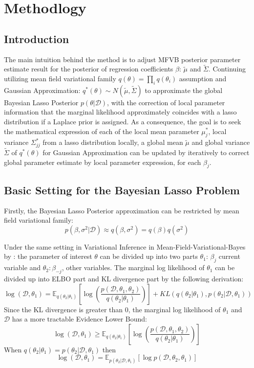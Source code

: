 \chapter{Methodlogy}
\label{Chapter3}
\section{Introduction}
The main intuition behind the method is to adjust MFVB posterior parameter estimate result for the posterior of regression coefficients $\beta$: $\tilde{\mu}$ and $\tilde{\Sigma}$. Continuing utilizing mean field variational family $q(\theta) = \prod_i q(\theta_i)$ assumption and Gaussian Approximation: $q^*(\theta) \sim N(\tilde{\mu},\tilde{\Sigma})$  to approximate the global Bayesian Lasso Posterior $p(\theta|\mathcal{D})$, with the correction of local parameter information that the marginal likelihood approximately coincides with a lasso distribution if a Laplace prior is assigned. As a consequence, the goal is to seek the mathematical expression of each of the local mean parameter $\mu_j^{*}$, local variance $\Sigma_{jj}^{*}$ from a lasso distribution locally, a global mean $\tilde{\mu}$ and global variance $\tilde{\Sigma}$ of $q^*(\theta)$ for Gaussian Approximation can be updated by iteratively to correct global parameter estimate by local parameter expression, for each $\beta_j$.


\section{Basic Setting for the Bayesian Lasso Problem}
Firstly, the Bayesian Lasso Posterior approximation can be restricted by mean field variational family:
\begin{equation}
	\label{eq:assum}
	p(\beta,\sigma^2|\mathcal{D})\approx q(\beta,\sigma^2) = q(\beta)q(\sigma^2)
\end{equation}

Under the same setting in Variational Inference in Mean-Field-Variational-Bayes by \cite{Ormerod2010ExplainingVA}:
the parameter of interest $\theta$ can be divided up into two parts $\theta_1$: $\beta_j$ current variable and $\theta_{2}: \beta_{-j}$, other variables. The marginal log likelihood of $\theta_1$ can be divided up into ELBO part and KL divergence part by the following derivation:
\begin{equation}
	\label{LocalGlobalVI}
	\log(\mathcal{D},\theta_1) = \mathbb{E}_{q(\theta_{2}|\theta_1)}[\log(\frac{p(\mathcal{D},\theta_1,\theta_{2})}{q(\theta_{2}|\theta_1)})] + KL(q(\theta_{2}|\theta_1),p(\theta_{2}|\mathcal{D},\theta_1))
\end{equation}
Since the KL divergence is greater than 0, the marginal log likelihood of $\theta_1$ and $\mathcal{D}$ has a more tractable Evidence Lower Bound: 
\begin{equation}
	\log(\mathcal{D},\theta_1) \geq \mathbb{E}_{q(\theta_{2}|\theta_1)}[\log(\frac{p(\mathcal{D},\theta_1,\theta_{2})}{q(\theta_{2}|\theta_1)})]
\end{equation}
When $q(\theta_{2}|\theta_1) = p(\theta_{2}|\mathcal{D},\theta_1)$ then 
$$
	\log(\mathcal{D},\theta_1) = \mathbb{E}_{p(\theta_{2}|\mathcal{D},\theta_1)}[\log p(\mathcal{D},\theta_2,\theta_{1})]
$$



